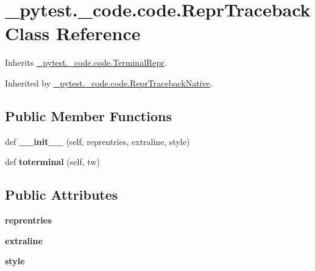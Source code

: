 \hypertarget{class__pytest_1_1__code_1_1code_1_1_repr_traceback}{}\section{\+\_\+pytest.\+\_\+code.\+code.\+Repr\+Traceback Class Reference}
\label{class__pytest_1_1__code_1_1code_1_1_repr_traceback}


Inherits \hyperlink{class__pytest_1_1__code_1_1code_1_1_terminal_repr}{\+\_\+pytest.\+\_\+code.\+code.\+Terminal\+Repr}.



Inherited by \hyperlink{class__pytest_1_1__code_1_1code_1_1_repr_traceback_native}{\+\_\+pytest.\+\_\+code.\+code.\+Repr\+Traceback\+Native}.

\subsection*{Public Member Functions}
\begin{DoxyCompactItemize}
\item 
\mbox{\label{class__pytest_1_1__code_1_1code_1_1_repr_traceback_a0e1f330b365b50623ee0274b87854f98}} 
def {\bfseries \+\_\+\+\_\+init\+\_\+\+\_\+} (self, reprentries, extraline, style)
\item 
\mbox{\label{class__pytest_1_1__code_1_1code_1_1_repr_traceback_ab295ae0e312dfe22f1f9499f20c65f14}} 
def {\bfseries toterminal} (self, tw)
\end{DoxyCompactItemize}
\subsection*{Public Attributes}
\begin{DoxyCompactItemize}
\item 
\mbox{\label{class__pytest_1_1__code_1_1code_1_1_repr_traceback_aafdb14c959b83f3902fd2a5231de5703}} 
{\bfseries reprentries}
\item 
\mbox{\label{class__pytest_1_1__code_1_1code_1_1_repr_traceback_ac430410af3173cd06efbf951d7a76e83}} 
{\bfseries extraline}
\item 
\mbox{\label{class__pytest_1_1__code_1_1code_1_1_repr_traceback_a005a951e256bb30792b4acf46d43d273}} 
{\bfseries style}
\end{DoxyCompactItemize}
